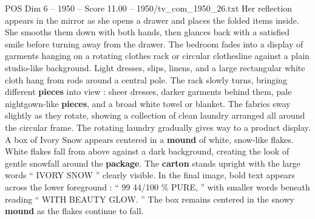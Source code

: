 \begin{textsample}{POS Dim 6 – 1950 – Score 11.00 – 1950/tv\_com\_1950\_26.txt}
Her reflection appears in the mirror as she opens a drawer and places the folded items inside.
She smooths them down with both hands, then glances back with a satisfied smile before turning away from the drawer.
The bedroom fades into a display of garments hanging on a rotating clothes rack or circular clothesline against a plain studio-like background.
Light dresses, slips, linens, and a large rectangular white cloth hang from rods around a central pole.
The rack slowly turns, bringing different \textbf{pieces} into view : sheer dresses, darker garments behind them, pale nightgown-like \textbf{pieces}, and a broad white towel or blanket.
The fabrics sway slightly as they rotate, showing a collection of clean laundry arranged all around the circular frame.
The rotating laundry gradually gives way to a product display.
A box of Ivory Snow appears centered in a \textbf{mound} of white, snow-like flakes.
White flakes fall from above against a dark background, creating the look of gentle snowfall around the \textbf{package}.
The \textbf{carton} stands upright with the large words “ IVORY SNOW ” clearly visible.
In the final image, bold text appears across the lower foreground : “ 99 44/100 \% PURE, ” with smaller words beneath reading “ WITH BEAUTY GLOW. ” The box remains centered in the snowy \textbf{mound} as the flakes continue to fall.

\end{textsample}

